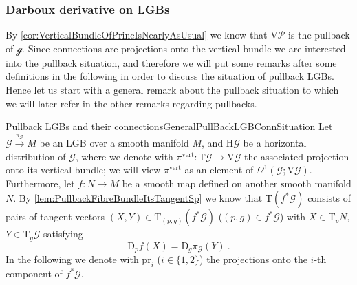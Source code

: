 \documentclass[reqno,a4paper,oneside]{amsart}
\theoremstyle{plain}
\theoremstyle{remark}
\theoremstyle{definition}
\begin{document}
\subsubsection{Darboux derivative on LGBs}\label{DiscussingDarbouxDerivativeGeneral}

By \ref{cor:VerticalBundleOfPrincIsNearlyAsUsual} we know that $\mathrm{V}\mathcal{P}$ is the pullback of $\mathcal{g}$. Since connections are projections onto the vertical bundle we are interested into the pullback situation, and therefore we will put some remarks after some definitions in the following in order to discuss the situation of pullback LGBs. Hence let us start with a general remark about the pullback situation to which we will later refer in the other remarks regarding pullbacks.

\begin{remarks}{Pullback LGBs and their connections}{GeneralPullBackLGBConnSituation}
Let $\mathcal{G} \stackrel{\pi_\mathcal{G}}{\to} M$ be an LGB over a smooth manifold $M$, and $\mathrm{H}\mathcal{G}$ be a horizontal distribution of $\mathcal{G}$, where we denote with $\pi^{\mathrm{vert}} \colon \mathrm{T}\mathcal{G} \to \mathrm{V}\mathcal{G}$ the associated projection onto its vertical bundle; we will view $\pi^{\mathrm{vert}}$ as an element of $\Omega^1(\mathcal{G}; \mathrm{V}\mathcal{G})$. Furthermore, let $f \colon N \to M$ be a smooth map defined on another smooth manifold $N$. By \ref{lem:PullbackFibreBundleItsTangentSp} we know that $\mathrm{T}(f^*\mathcal{G})$ consists of pairs of tangent vectors $(X, Y) \in \mathrm{T}_{(p, g)}(f^*\mathcal{G})$ ($(p, g) \in f^*\mathcal{G}$) with $X \in \mathrm{T}_pN$, $Y \in \mathrm{T}_g\mathcal{G}$ satisfying
\begin{equation*}
\mathrm{D}_pf(X) = \mathrm{D}_g\pi_{\mathcal{G}}(Y)~.
\end{equation*}
In the following we denote with $\mathrm{pr}_i$ ($i \in \{1,2\}$) the projections onto the $i$-th component of $f^*\mathcal{G}$.


\end{remarks}
\end{document}
